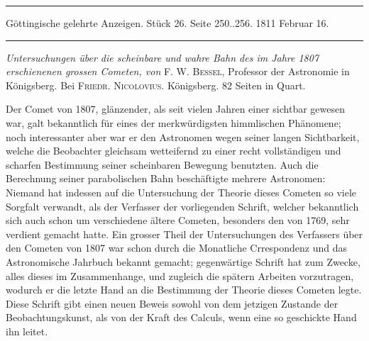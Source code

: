 \par\bigskip
\hypertarget{native-535lower}{}\label{native-535lower}
\begin{center}
\parbox{.92\linewidth}{\centering\small
\rule{\linewidth}{.3pt}\par\smallskip
Göttingische gelehrte Anzeigen. Stück 26. Seite 250..256. 1811 Februar 16.\par\smallskip
\rule{\linewidth}{.3pt}}
\end{center}
\par\medskip

\emph{Untersuchungen über die scheinbare und wahre Bahn des im Jahre \textup{1807} erschienenen grossen Cometen, von} F. W. \textsc{Bessel}, Professor der Astronomie in Königsberg. Bei \textsc{Friedr. Nicolovius}. Königsberg. 82 Seiten in Quart.

Der Comet von 1807, glänzender, als seit vielen Jahren einer sichtbar gewesen war, galt bekanntlich für eines der merkwürdigsten himmlischen Phänomene; noch interessanter aber war er den Astronomen wegen seiner langen Sichtbarkeit, welche die Beobachter gleichsam wetteifernd zu einer recht vollständigen und scharfen Bestimmung seiner scheinbaren Bewegung benutzten. Auch die Berechnung seiner parabolischen Bahn beschäftigte mehrere Astronomen: Niemand hat indessen auf die Untersuchung der Theorie dieses Cometen so viele Sorgfalt verwandt, als der Verfasser der vorliegenden Schrift, welcher bekanntlich sich auch schon um verschiedene ältere Cometen, besonders den von 1769, sehr verdient gemacht hatte. Ein grosser Theil der Untersuchungen des Verfassers über den Cometen von 1807 war schon durch die Monatliche Crrespondenz und das Astronomische Jahrbuch bekannt gemacht; gegenwärtige Schrift hat zum Zwecke, alles dieses im Zusammenhange, und zugleich die spätern Arbeiten vorzutragen, wodurch er die letzte Hand an die Bestimmung der Theorie dieses Cometen legte. Diese Schrift gibt einen neuen Beweis sowohl von dem jetzigen Zustande der Beobachtungskunst, als von der Kraft des Calculs, wenn eine so geschickte Hand ihn leitet.

